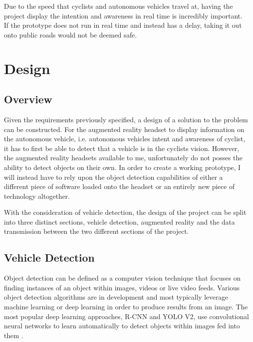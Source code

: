 \documentclass{l4proj}
\begin{document}
Due to the speed that cyclists and autonomous vehicles travel at, having the project display the intention and awareness in real time is incredibly important. If the prototype does not run in real time and instead has a delay, taking it out onto public roads would not be deemed safe.


\chapter{Design}

\section{Overview}

Given the requirements previously specified, a design of a solution to the problem can be constructed. For the augmented reality headset to display information on the autonomous vehicle, i.e. autonomous vehicles intent and awareness of cyclist, it has to first be able to detect that a vehicle is in the cyclists vision. However, the augmented reality headsets available to me, unfortunately do not posses the ability to detect objects on their own. In order to create a working prototype, I will instead have to rely upon the object detection capabilities of either a different piece of software loaded onto the headset or an entirely new piece of technology altogether.

With the consideration of vehicle detection, the design of the project can be split into three distinct sections, vehicle detection, augmented reality and the data transmission between the two different sections of the project.

\section{Vehicle Detection}

Object detection can be defined as a computer vision technique that focuses on finding instances of an object within images, videos or live video feeds. Various object detection algorithms are in development and most typically leverage machine learning or deep learning in order to produce results from an image. The most popular deep learning approaches, R-CNN and YOLO V2, use convolutional neural networks to learn automatically to detect objects within images fed into them \citep{od_definition}.
\end{document}
